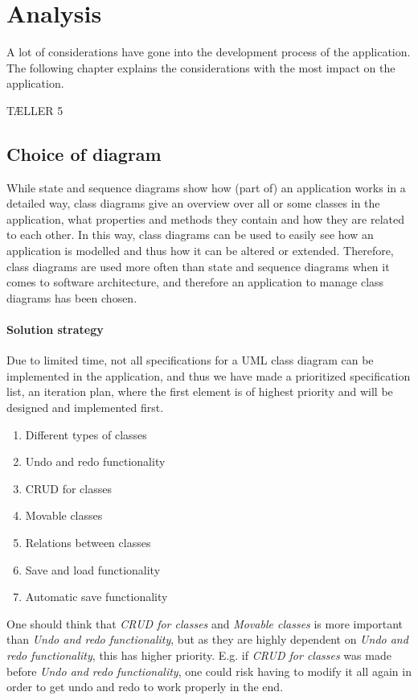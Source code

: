 \chapter{Analysis}
\label{sec:analysis}
A lot of considerations have gone into the development process of the application. The following chapter explains the considerations with the most impact on the application.

TÆLLER 5

\section{Choice of diagram}
\label{sec:choice_diagram}

While state and sequence diagrams show how (part of) an application works in a detailed way, class diagrams give an overview over all or some classes in the application, what properties and methods they contain and how they are related to each other. In this way, class diagrams can be used to easily see how an application is modelled and thus how it can be altered or extended. Therefore, class diagrams are used more often than state and sequence diagrams when it comes to software architecture, and therefore an application to manage class diagrams has been chosen.

\subsubsection{Solution strategy}
\label{sec:sol_strat}

Due to limited time, not all specifications for a UML class diagram can be implemented in the application, and thus we have made a prioritized specification list, an iteration plan, where the first element is of highest priority and will be designed and implemented first.

\begin{enumerate}
  \item Different types of classes
  \item Undo and redo functionality
  \item CRUD for classes
  \item Movable classes
  \item Relations between classes
  \item Save and load functionality
  \item Automatic save functionality
\end{enumerate}

One should think that \textit{CRUD for classes} and \textit{Movable classes} is more important than \textit{Undo and redo functionality}, but as they are highly dependent on \textit{Undo and redo functionality}, this has higher priority. E.g. if \textit{CRUD for classes} was made before \textit{Undo and redo functionality}, one could risk having to modify it all again in order to get undo and redo to work properly in the end.

